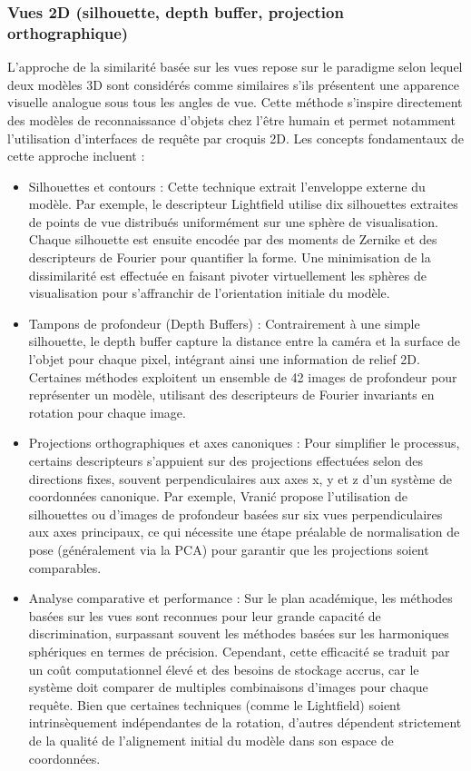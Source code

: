 \documentclass[11pt,a4paper,oneside]{report}
\begin{document}
\subsubsection{Vues 2D (silhouette, depth buffer, projection orthographique)}

L'approche de la similarité basée sur les vues repose sur le paradigme selon lequel deux modèles 3D sont considérés comme similaires s'ils présentent une apparence visuelle analogue sous tous les angles de vue. Cette méthode s'inspire directement des modèles de reconnaissance d'objets chez l'être humain et permet notamment l'utilisation d'interfaces de requête par croquis 2D. Les concepts fondamentaux de cette approche incluent :

\begin{itemize}
    \item Silhouettes et contours : Cette technique extrait l'enveloppe externe du modèle. Par exemple, le descripteur Lightfield utilise dix silhouettes extraites de points de vue distribués uniformément sur une sphère de visualisation. Chaque silhouette est ensuite encodée par des moments de Zernike et des descripteurs de Fourier pour quantifier la forme. Une minimisation de la dissimilarité est effectuée en faisant pivoter virtuellement les sphères de visualisation pour s'affranchir de l'orientation initiale du modèle.
    \item Tampons de profondeur (Depth Buffers) : Contrairement à une simple silhouette, le depth buffer capture la distance entre la caméra et la surface de l'objet pour chaque pixel, intégrant ainsi une information de relief 2D. Certaines méthodes exploitent un ensemble de 42 images de profondeur pour représenter un modèle, utilisant des descripteurs de Fourier invariants en rotation pour chaque image.
    \item Projections orthographiques et axes canoniques : Pour simplifier le processus, certains descripteurs s'appuient sur des projections effectuées selon des directions fixes, souvent perpendiculaires aux axes x, y et z d'un système de coordonnées canonique. Par exemple, Vranić propose l'utilisation de silhouettes ou d'images de profondeur basées sur six vues perpendiculaires aux axes principaux, ce qui nécessite une étape préalable de normalisation de pose (généralement via la PCA) pour garantir que les projections soient comparables.
    \item Analyse comparative et performance : Sur le plan académique, les méthodes basées sur les vues sont reconnues pour leur grande capacité de discrimination, surpassant souvent les méthodes basées sur les harmoniques sphériques en termes de précision. Cependant, cette efficacité se traduit par un coût computationnel élevé et des besoins de stockage accrus, car le système doit comparer de multiples combinaisons d'images pour chaque requête. Bien que certaines techniques (comme le Lightfield) soient intrinsèquement indépendantes de la rotation, d'autres dépendent strictement de la qualité de l'alignement initial du modèle dans son espace de coordonnées.
\end{itemize}
\end{document}
